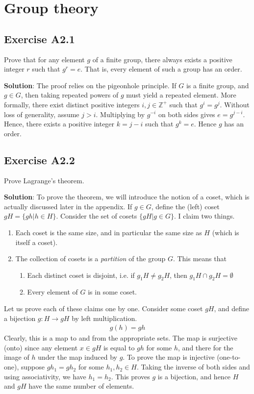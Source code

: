 \documentclass{book}
\begin{document}
\chapter{Group theory}


\section*{Exercise A2.1}
    Prove that for any element $g$ of a finite group, there always exists a positive integer $r$ such that $g^r = e$. That is, every element of such a group has an order.
    
    \textbf{Solution}: The proof relies on the pigeonhole principle. If $G$ is a finite group, and $g\in G$, then taking repeated powers of $g$ must yield a repeated element. More formally, there exist distinct positive integers $i,j \in \mathbb{Z^+}$ such that $g^i = g^j$. Without loss of generality, assume $j>i$. Multiplying by $g^{-i}$ on both sides gives $e = g^{j-i}$. Hence, there exists a positive integer $k=j-i$ such that $g^k = e$. Hence $g$ has an order. 
    
\section*{Exercise A2.2}
    Prove Lagrange's theorem.
    
    \textbf{Solution}: To prove the theorem, we will introduce the notion of a coset, which is actually discussed later in the appendix. If $g\in G$, define the (left) coset $gH = \{gh|h\in H\}$. Consider the set of cosets $\{gH| g\in G\}$. I claim two things.
    \begin{enumerate}
        \item Each coset is the same size, and in particular the same size as $H$ (which is itself a coset).
        \item The collection of cosets is a \emph{partition} of the group $G$. This means that
        \begin{enumerate}
            \item Each distinct coset is disjoint, i.e. if $g_1 H \neq g_2 H$, then $g_1 H \cap g_2 H = \emptyset$
            \item Every element of $G$ is in some coset.
        \end{enumerate}
    \end{enumerate}
    Let us prove each of these claims one by one. Consider some coset $gH$, and define a bijection $g:H\rightarrow gH$ by left multiplication.
    \begin{align}
        g(h) = gh
    \end{align}
    Clearly, this is a map to and from the appropriate sets. The map is surjective (onto) since any element $x\in gH$ is equal to $gh$ for some $h$, and there for the image of $h$ under the map induced by $g$. To prove the map is injective (one-to-one), suppose $gh_1 = gh_2$ for some $h_1, h_2 \in H$. Taking the inverse of both sides and using associativity, we have $h_1 = h_2$. This proves $g$ is a bijection, and hence $H$ and $gH$ have the same number of elements. 
    
\end{document}
